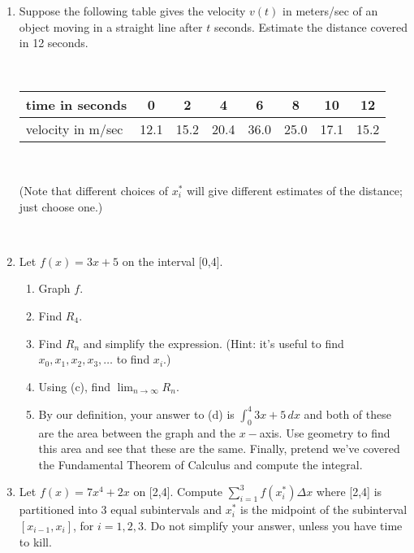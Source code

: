 \documentclass[11pt, oneside]{article}   	%
\title{}
\author{Week 1 discussion problems}
\date{}							%
\begin{document}
\maketitle

\begin{enumerate}
\item Suppose the following table gives the velocity $v(t)$ in meters/sec of an object moving in a straight line after $t$ seconds. Estimate the distance covered in 12 seconds. 

\

\begin{tabular}{|  l | c |  c |  c |  c |  c |  c |  c  |}
\hline
time in seconds & 0 & 2 & 4 & 6 & 8 & 10 & 12 \\
\hline
velocity in m/sec & 12.1 & 15.2 & 20.4 & 36.0 & 25.0 & 17.1 & 15.2 \\
\hline
\end{tabular}

\

(Note that different choices of $x_i^*$ will give different estimates of the distance; just choose one.)

\

\item
Let $f(x)=3x+5$ on the interval [0,4].

\begin{enumerate}
\item Graph $f$.

\item Find $R_4$.

\item Find $R_n$ and simplify the expression. (Hint: it's useful to find $x_0, x_1, x_2, x_3, \ldots$ to find $x_i$.)

\item Using (c), find $\lim_{n \to \infty} R_n$.

\item By our definition, your answer to (d) is $\int_0^4 3x+5 \, dx$ and both of these are the area between the graph and the $x-$axis. Use geometry to find this area and see that these are the same. Finally, pretend we've covered the Fundamental Theorem of Calculus and compute the integral.

\end{enumerate}

\item Let $f(x)=7x^4+2x$ on [2,4]. Compute $\sum_{i=1}^3 f(x_i^*) \Delta x$ where [2,4] is partitioned into 3 equal subintervals and $x_i^*$ is the midpoint of the subinterval $[x_{i-1},x_i]$, for $i=1,2,3.$ Do not simplify your answer, unless you have time to kill.



\end{enumerate}
\end{document}
